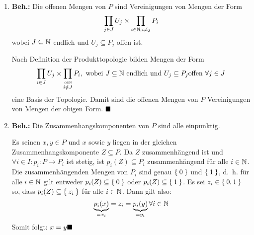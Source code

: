 \begin{solution}[\ref{ub2:aufg4}]
    \begin{enumerate}[label=(\alph*)]
        \item \textbf{Beh.:} Die offenen Mengen von $P$ sind
              Vereinigungen von Mengen der Form 
              \[\prod_{j \in J} U_j \times \prod_{i \in \mathbb{N}, i \neq j} P_i\]
              wobei $J \subseteq \mathbb{N}$ endlich und $U_j \subseteq P_j$
              offen ist.
              \begin{beweis}
                Nach Definition der Produkttopologie bilden Mengen
                der Form
                \[\prod_{i \in J} U_j \times \prod_{\overset{i \in \mathbb{N}}{i \notin J}} P_i, \text{ wobei } J \subseteq \mathbb{N} \text{ endlich und } U_j \subseteq P_j \text{offen } \forall{j \in J}\]
                eine Basis der Topologie. Damit sind die offenen 
                Mengen von $P$ Vereinigungen von Mengen der obigen
                Form. $\qed$
              \end{beweis}
        \item \textbf{Beh.:} Die Zusammenhangskomponenten von $P$
              sind alle einpunktig.
              \begin{beweis}
                Es seinen $x,y \in P$ und $x$ sowie $y$ liegen in der
                gleichen Zusammenhangskomponente $Z \subseteq P$.
                Da $Z$ zusammenhängend ist und $\forall{i \in I}: p_i : P \rightarrow P_i$
                ist stetig, ist $p_i(Z) \subseteq P_i$ zusammenhängend
                für alle $i \in \mathbb{N}$. Die zusammenhängenden Mengen
                von $P_i$ sind genau $\Set{0}$ und $\Set{1}$, d.~h.
                für alle $i \in \mathbb{N}$ gilt entweder $p_i(Z) \subseteq \Set{0}$
                oder $p_i(Z) \subseteq \Set{1}$. Es sei $z_i \in \Set{0,1}$
                so, dass $p_i(Z) \subseteq \Set{z_i}$ für alle $i \in \mathbb{N}$.
                Dann gilt also: 
                \[\underbrace{p_i(x)}_{= x_i} = z_i = \underbrace{p_i(y)}_{= y_i} \forall i \in \mathbb{N}\]
                Somit folgt: $x = y \qed$
                
              \end{beweis}
    \end{enumerate}
\end{solution}

